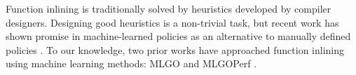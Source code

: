 \documentclass[nohyperref]{article}
\theoremstyle{plain}
\theoremstyle{definition}
\theoremstyle{remark}
\begin{document}
Function inlining is traditionally solved by heuristics developed by compiler designers. Designing good heuristics is a non-trivial task, but recent work has shown promise in machine-learned policies as an alternative to manually defined policies \cite{mlgo}. To our knowledge, two prior works have approached function inlining using machine learning methods: MLGO \cite{mlgo} and MLGOPerf \cite{mlgoperf}.





\end{document}
